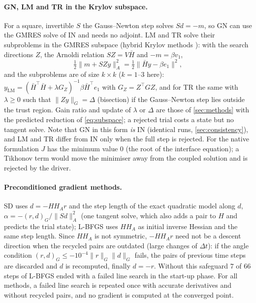 \documentclass[11pt,a4paper]{article}
\theoremstyle{definition}
\theoremstyle{remark}
\begin{document}
\paragraph{GN, LM and TR in the Krylov subspace.} For a square, invertible $S$ the Gauss--Newton step
solves $Sd=-m$, so GN can use the GMRES solve of IN and needs no adjoint. LM and TR solve their
subproblems in the GMRES subspace (hybrid Krylov methods \cite{BrownSaad1990}): with the search
directions $Z$, the Arnoldi relation $SZ=V\bar H$ and $-m=\beta v_1$,
\begin{equation}\label{eq:subspace}
  \tfrac12\|m+SZy\|_A^2=\tfrac12\|\bar Hy-\beta e_1\|^2,
\end{equation}
and the subproblems are of size $k\times k$ ($k=1$--$3$ here):
$y_{\mathrm{LM}}=(\bar H^{\top}\bar H+\lambda G_Z)^{-1}\beta\bar H^{\top}e_1$ with
$G_Z=Z^{\top}GZ$, and for TR the same with $\lambda\ge0$ such that $\|Zy\|_G=\Delta$ (bisection) if
the Gauss--Newton step lies outside the trust region. Gain ratio and update of $\lambda$ or $\Delta$
are those of \cref{sec:methods} with the predicted reduction of \eqref{eq:subspace}; a rejected
trial costs a state but no tangent solve. Note that GN in this form \emph{is} IN (identical runs,
\cref{sec:consistency}), and LM and TR differ from IN only when the full step is rejected. For the
native formulation $J$ has the minimum value $0$ (the root of the interface equation); a Tikhonov
term would move the minimiser away from the coupled solution and is rejected by the driver.

\paragraph{Preconditioned gradient methods.} SD uses $d=-HH_Ar$ and the step length of the exact
quadratic model along $d$, $\alpha=-(r,d)_G/\|Sd\|_A^2$ (one tangent solve, which also adds a pair
to $H$ and predicts the trial state); L-BFGS uses $HH_A$ as initial inverse Hessian and the same
step length. Since $HH_A$ is not symmetric, $-HH_Ar$ need not be a descent direction when the
recycled pairs are outdated (large changes of $\Delta t$): if the angle condition
$(r,d)_G\le-10^{-4}\|r\|_G\|d\|_G$ fails, the pairs of previous time steps are discarded and $d$ is
recomputed, finally $d=-r$. Without this safeguard $7$ of $66$ steps of L-BFGS ended with a failed
line search in the start-up phase. For all methods, a failed line search is repeated once with
accurate derivatives and without recycled pairs, and no gradient is computed at the converged
point.
\end{document}
